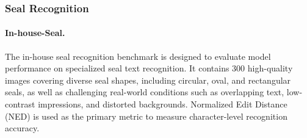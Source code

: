 \documentclass[11pt, a4paper,logo,  copyright, nonumbering]{paddleocr}
\begin{document}
\begin{table}[htbp]
\centering
{}
\caption{Comparison of text spotting performance on the in-house benchmark. Overall denotes the average accuracy across all 9 evaluation dimensions.}
\label{tab:spotting}
\end{table}



\subsubsection{Seal Recognition}
\label{Seal Recognition}

\paragraph{In-house-Seal.}
The in-house seal recognition benchmark is designed to evaluate model performance on specialized seal text recognition. It contains 300 high-quality images covering diverse seal shapes, including circular, oval, and rectangular seals, as well as challenging real-world conditions such as overlapping text, low-contrast impressions, and distorted backgrounds. Normalized Edit Distance (NED) is used as the primary metric to measure character-level recognition accuracy.
\end{document}

